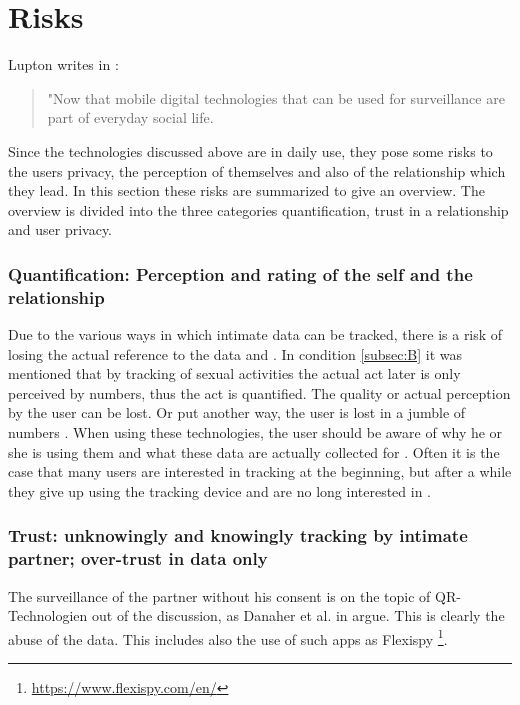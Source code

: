 \section{Risks}
\label{sec:risks}
Lupton writes in \cite{doi:10.1080/13691058.2014.920528}:
\begin{quote}
	"Now that mobile digital technologies that can be used for surveillance are part of everyday social life.
\end{quote}
Since the technologies discussed above are in daily use, they pose some risks to the users privacy, the perception of themselves and also of the relationship which they lead.
In this section these risks are summarized to give an overview.
The overview is divided into the three categories quantification, trust in a relationship and user privacy.

\subsubsection{Quantification: Perception and rating of the self and the relationship}
Due to the various ways in which intimate data can be tracked, there is a risk of losing the actual reference to the data \cite{doi:10.1080/13691058.2014.920528} and \cite{lupton2016quantified}. In condition \ref{subsec:B} it was mentioned that by tracking of sexual activities the actual act later is only perceived by numbers, thus the act is quantified. The quality or actual perception by the user can be lost. Or put another way, the user is lost in a jumble of numbers \cite{kelly2017inevitable}.
When using these technologies, the user should be aware of why he or she is using them and what these data are actually collected for \cite{doi:10.1080/15265161.2017.1409823}. 
Often it is the case that many users are interested in tracking at the beginning, but after a while they give up using the tracking device and are no long interested in \cite{sjoklint2015complexities}.

\subsubsection{Trust: unknowingly and knowingly tracking by intimate partner; over-trust in data only}
The surveillance of the partner without his consent is on the topic of \acs{QR}-Technologien out of the discussion, as Danaher et al. in \cite{doi:10.1080/15265161.2017.1409823} argue. This is clearly the abuse of the data. This includes also the use of such apps as Flexispy \footnote{\url{https://www.flexispy.com/en/}}.

